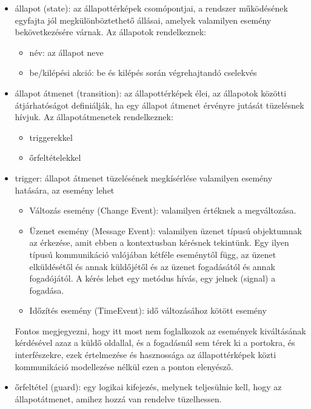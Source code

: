 \begin{itemize}
	\item állapot (state): az állapottérképek csomópontjai, a rendszer működésének egyfajta jól megkülönböztethető állásai, amelyek valamilyen esemény bekövetkezésére várnak. Az állapotok rendelkeznek:
	\begin{itemize}
		\item név: az állapot neve
		\item be/kilépési akció: be és kilépés során végrehajtandó cselekvés
	\end{itemize}
	
	\item állapot átmenet (transition): az állapottérképek élei, az állapotok közötti átjárhatóságot definiálják, ha egy állapot átmenet érvényre jutását tüzelésnek hívjuk. Az állapotátmenetek rendelkeznek:
		\begin{itemize}
			\item triggerekkel
			\item őrfeltételekkel
		\end{itemize}
	\item trigger: állapot átmenet tüzelésének megkísérlése valamilyen esemény hatására, az esemény lehet
	\begin{itemize}
		\item Változás esemény (Change Event): valamilyen értéknek a megváltozása.
		\item Üzenet esemény (Message Event): valamilyen üzenet típusú objektumnak az érkezése, amit ebben a kontextusban kérésnek tekintünk. Egy ilyen típusú kommunikáció valójában kétféle eseménytől függ, az üzenet elküldésétől és annak küldőjétől és az üzenet fogadásától és annak fogadójától. A kérés lehet egy metódus hívás, egy jelnek (signal) a fogadása.
		\item Időzítés esemény (TimeEvent): idő változásához kötött esemény
	\end{itemize}
	Fontos megjegyezni, hogy itt most nem foglalkozok az események kiváltásának kérdésével azaz a küldő oldallal, és a fogadásnál sem térek ki a portokra, és interfészekre, ezek értelmezése és hasznossága az állapottérképek közti kommunikáció modellezése nélkül ezen a ponton elenyésző.
	\item őrfeltétel (guard): egy logikai kifejezés, melynek teljesülnie kell, hogy az állapotátmenet, amihez hozzá van rendelve tüzelhessen.

\end{itemize}
